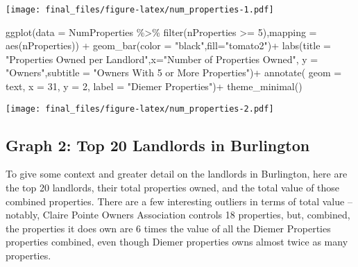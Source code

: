 \documentclass[
]{article}
\newenvironment{Shaded}{\begin{snugshade}}{\end{snugshade}}
\newcommand{\AttributeTok}[1]{\textcolor[rgb]{0.77,0.63,0.00}{#1}}
\newcommand{\DecValTok}[1]{\textcolor[rgb]{0.00,0.00,0.81}{#1}}
\newcommand{\FunctionTok}[1]{\textcolor[rgb]{0.00,0.00,0.00}{#1}}
\newcommand{\NormalTok}[1]{#1}
\newcommand{\SpecialCharTok}[1]{\textcolor[rgb]{0.00,0.00,0.00}{#1}}
\newcommand{\StringTok}[1]{\textcolor[rgb]{0.31,0.60,0.02}{#1}}
\begin{document}
\texttt{[image: final\_files/figure-latex/num\_properties-1.pdf]}

\begin{Shaded}
\begin{Highlighting}[]
\FunctionTok{ggplot}\NormalTok{(}\AttributeTok{data =}\NormalTok{ NumProperties }\SpecialCharTok{\%\textgreater{}\%} \FunctionTok{filter}\NormalTok{(nProperties }\SpecialCharTok{\textgreater{}=} \DecValTok{5}\NormalTok{),}\AttributeTok{mapping =} \FunctionTok{aes}\NormalTok{(nProperties)) }\SpecialCharTok{+}
        \FunctionTok{geom\_bar}\NormalTok{(}\AttributeTok{color =} \StringTok{"black"}\NormalTok{,}\AttributeTok{fill=}\StringTok{"tomato2"}\NormalTok{)}\SpecialCharTok{+}
        \FunctionTok{labs}\NormalTok{(}\AttributeTok{title =} \StringTok{"Properties Owned per Landlord"}\NormalTok{,}\AttributeTok{x=}\StringTok{"Number of Properties Owned"}\NormalTok{,}
             \AttributeTok{y =} \StringTok{"Owners"}\NormalTok{,}\AttributeTok{subtitle =} \StringTok{"Owners With 5 or More Properties"}\NormalTok{)}\SpecialCharTok{+}
         \FunctionTok{annotate}\NormalTok{( }\AttributeTok{geom =} \StringTok{\textquotesingle{}text\textquotesingle{}}\NormalTok{, }\AttributeTok{x =} \DecValTok{31}\NormalTok{, }\AttributeTok{y =} \DecValTok{2}\NormalTok{, }\AttributeTok{label =} \StringTok{"Diemer Properties"}\NormalTok{)}\SpecialCharTok{+}
        \FunctionTok{theme\_minimal}\NormalTok{()}
\end{Highlighting}
\end{Shaded}

\texttt{[image: final\_files/figure-latex/num\_properties-2.pdf]}

\hypertarget{graph-2-top-20-landlords-in-burlington}{%
\subsection{Graph 2: Top 20 Landlords in
Burlington}\label{graph-2-top-20-landlords-in-burlington}}

To give some context and greater detail on the landlords in Burlington,
here are the top 20 landlords, their total properties owned, and the
total value of those combined properties. There are a few interesting
outliers in terms of total value -- notably, Claire Pointe Owners
Association controls 18 properties, but, combined, the properties it
does own are 6 times the value of all the Diemer Properties properties
combined, even though Diemer properties owns almost twice as many
properties.
\end{document}
